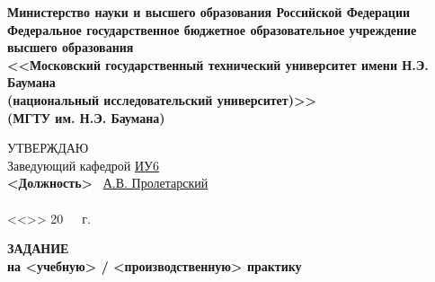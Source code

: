 \documentclass[10pt]{templateTaskBMSTU}
\begin{document}
	\thispagestyle{empty}
	\begin{center}
		\textbf{Министерство науки и высшего образования Российской Федерации 
		\\ Федеральное государственное бюджетное образовательное учреждение 
		\\ высшего образования 
		\\ <<Московский государственный технический университет имени Н.Э. Баумана
		\\ (национальный исследовательский университет)>>
		\\ (МГТУ им. Н.Э. Баумана)}
		\fontsize{12pt}{0.15\baselineskip}\selectfont
		\noindent \makebox[\linewidth]{\rule{\textwidth}{4pt}} \makebox[\linewidth]{\rule{\textwidth}{1pt}}
	\end{center}	
	\normalsize
	\begin{flushright}
		УТВЕРЖДАЮ \hspace*{1.4cm}
		\\
		Заведующий кафедрой \uline{\hspace*{0.5cm}}\uline{ИУ6}\uline{\hspace*{0.5cm}} 
		\\ \hfill \textbf{<Должность>} \uline{\hspace*{2.5cm}} \ \uline{А.В. Пролетарский} 
		\\ \hfill
		\\ <<\uline{\hspace*{1cm}}>> \uline{\hspace*{2.5cm}} 20\ \ \   г. %
	\end{flushright}

	\begin{center}
		\fontsize{18pt}{\baselineskip}\selectfont \textbf{ЗАДАНИЕ}
		\\ \fontsize{16pt}{\baselineskip}\selectfont \textbf{на <учебную> / <производственную> практику} %
	\end{center}

	\normalsize
\end{document}
